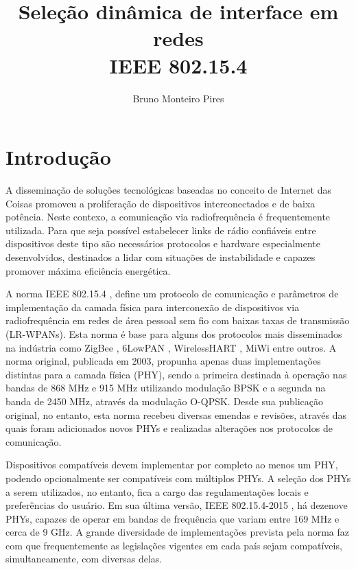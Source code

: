 \documentclass{article}
\begin{document}
\title{Seleção dinâmica de interface em redes \\ IEEE 802.15.4}
\author{Bruno Monteiro Pires}
\maketitle
\clearpage

\section{Introdução}
	A disseminação de soluções tecnológicas baseadas no conceito de Internet das Coisas promoveu a proliferação de dispositivos interconectados e de baixa potência. Neste contexo, a comunicação via radiofrequência é frequentemente utilizada. Para que seja possível estabelecer links de rádio confiáveis entre dispositivos deste tipo são necessários protocolos e hardware especialmente desenvolvidos, destinados a lidar com situações de instabilidade e capazes promover máxima eficiência energética.

	A norma IEEE 802.15.4 \cite{1237559}, define um protocolo de comunicação e parâmetros de implementação da camada física para interconexão de dispositivos via radiofrequência em redes de área pessoal sem fio com baixas taxas de transmissão (LR-WPANs). Esta norma é base para alguns dos protocolos mais disseminados na indústria como ZigBee \cite{bibid}, 6LowPAN \cite{bibid}, WirelessHART \cite{bibid}, MiWi \cite{bibid} entre outros. A norma original, publicada em 2003, propunha apenas duas implementações distintas para a camada física (PHY), sendo a primeira destinada à operação nas bandas de 868 MHz e 915 MHz utilizando modulação BPSK e a segunda na banda de 2450 MHz, através da modulação O-QPSK. Desde sua publicação original, no entanto, esta norma recebeu diversas emendas e revisões, através das quais foram adicionados novos PHYs e realizadas alterações nos protocolos de comunicação. 
	
	Dispositivos compatíveis devem implementar por completo ao menos um PHY, podendo opcionalmente ser compatíveis com múltiplos PHYs. A seleção dos PHYs a serem utilizados, no entanto, fica a cargo das regulamentações locais e preferências do usuário. Em sua última versão, IEEE 802.15.4-2015 \cite{7460875}, há dezenove PHYs, capazes de operar em bandas de frequência que variam entre 169 MHz e cerca de 9 GHz. A grande diversidade de  implementações prevista pela norma faz com que frequentemente as legislações vigentes em cada país sejam compatíveis, simultaneamente, com diversas delas.
	
\end{document}
